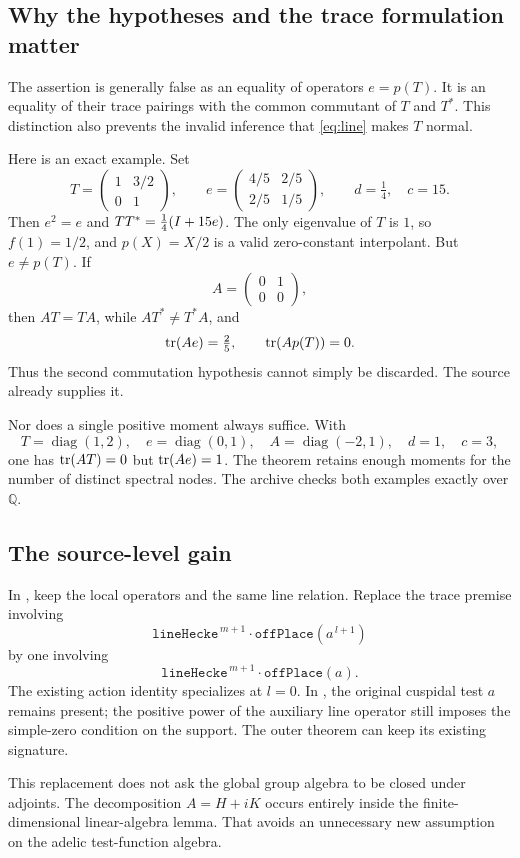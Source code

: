 \subsection{Why the hypotheses and the trace formulation matter}

The assertion is generally false as an equality of operators \(e=p(T)\).
It is an equality of their trace pairings with the common commutant of
\(T\) and \(T^*\). This distinction also prevents the invalid inference that
\eqref{eq:line} makes \(T\) normal.

Here is an exact example. Set
\[
 T=\begin{pmatrix}1&3/2\\0&1\end{pmatrix},\qquad
 e=\begin{pmatrix}4/5&2/5\\2/5&1/5\end{pmatrix},
 \qquad d=\tfrac14,\quad c=15.
\]
Then \(e^2=e\) and \(TT^*=\tfrac14(I+15e)\).
The only eigenvalue of \(T\) is \(1\), so \(f(1)=1/2\), and
\(p(X)=X/2\) is a valid zero-constant interpolant. But \(e\ne p(T)\).
If
\[
 A=\begin{pmatrix}0&1\\0&0\end{pmatrix},
\]
then \(AT=TA\), while \(AT^*\ne T^*A\), and
\[
 \operatorname{tr}(Ae)=\tfrac25,\qquad \operatorname{tr}(Ap(T))=0.
\]
Thus the second commutation hypothesis cannot simply be discarded. The source
 already supplies it.

Nor does a single positive moment always suffice. With
\[
 T=\operatorname{diag}(1,2),\quad e=\operatorname{diag}(0,1),\quad
 A=\operatorname{diag}(-2,1),\quad d=1,\quad c=3,
\]
one has \(\operatorname{tr}(AT)=0\) but \(\operatorname{tr}(Ae)=1\).
The theorem retains enough moments for the number of distinct spectral nodes.
The archive checks both examples exactly over \(\mathbb Q\).

\subsection{The source-level gain}

In , keep the local operators and the same line relation.
Replace the trace premise involving
\[
 \texttt{lineHecke}^{\,m+1}\cdot\texttt{offPlace}(a^{\,l+1})
\]
by one involving
\[
 \texttt{lineHecke}^{\,m+1}\cdot\texttt{offPlace}(a).
\]
The existing action identity specializes at \(l=0\).
In , the original cuspidal test \(a\) remains present;
the positive power of the auxiliary line operator still imposes the simple-zero
condition on the support. The outer theorem
 can keep its existing signature.

This replacement does not ask the global group algebra to be closed under adjoints.
The decomposition \(A=H+iK\) occurs entirely inside the finite-dimensional
linear-algebra lemma. That avoids an unnecessary new assumption on the
adelic test-function algebra.
